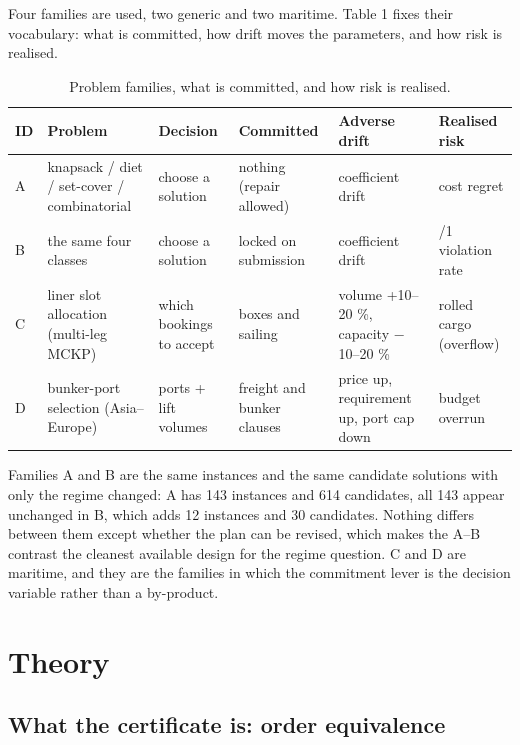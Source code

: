 \documentclass[preprint,12pt,letterpaper]{elsarticle}
\theoremstyle{definition}
\theoremstyle{plain}
\begin{document}
Four families are used, two generic and two maritime. Table 1 fixes their vocabulary: what is committed, how drift moves the parameters, and how risk is realised.

\begin{table}[t]
\centering
\caption{Problem families, what is committed, and how risk is realised.}
\small
\setlength{\tabcolsep}{5pt}
\begin{tabular}{@{}>{\raggedright\arraybackslash}p{26.0pt}>{\raggedright\arraybackslash}p{102.0pt}>{\raggedright\arraybackslash}p{62.8pt}>{\raggedright\arraybackslash}p{74.4pt}>{\raggedright\arraybackslash}p{97.7pt}>{\raggedright\arraybackslash}p{71.1pt}@{}}
\toprule
ID & Problem & Decision & Committed & Adverse drift & Realised risk \\
\midrule
A & knapsack / diet / set-cover / combinatorial & choose a solution & nothing (repair allowed) & coefficient drift & cost regret \\
B & the same four classes & choose a solution & locked on submission & coefficient drift & 0/1 violation rate \\
C & liner slot allocation (multi-leg MCKP) & which bookings to accept & boxes and sailing & volume +10--20 \%, capacity $-$10--20 \% & rolled cargo (overflow) \\
D & bunker-port selection (Asia--Europe) & ports + lift volumes & freight and bunker clauses & price up, requirement up, port cap down & budget overrun \\
\bottomrule
\end{tabular}
\end{table}

Families A and B are the same instances and the same candidate solutions with only the regime changed: A has 143 instances and 614 candidates, all 143 appear unchanged in B, which adds 12 instances and 30 candidates. Nothing differs between them except whether the plan can be revised, which makes the A--B contrast the cleanest available design for the regime question. C and D are maritime, and they are the families in which the commitment lever is the decision variable rather than a by-product.

\section{Theory}

\subsection{What the certificate is: order equivalence}
\end{document}
